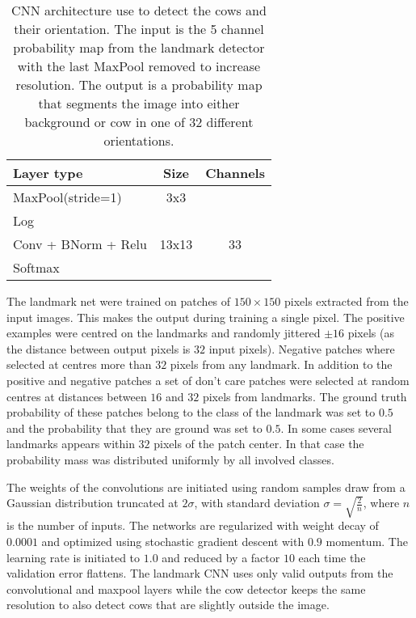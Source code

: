 \documentclass[10pt,a4paper,twocolumn]{article}
\begin{document}
\begin{table}
\begin{center}
\begin{tabular}{|l|c|c|}
\hline 
\textbf{Layer type} & \textbf{Size} & \textbf{Channels} \\ 
\hline 

MaxPool(stride=1) & 3x3 &  \\ 
Log & & \\
Conv + BNorm + Relu & 13x13 & 33 \\ 
Softmax & & \\
\hline 
\end{tabular}
\end{center}
\caption{CNN architecture use to detect the cows and their orientation. The input is the 5 channel probability map from the landmark detector with the last MaxPool removed to increase resolution. The output is a probability map that segments the image into either background or cow in one of 32 different orientations.}
\label{tab:cowdirnet}
\end{table}

The landmark net were trained on patches of $150\times 150$ pixels extracted from the input images. This makes the output during training a single pixel. The positive examples were centred on the landmarks and randomly jittered $\pm 16$ pixels (as the distance between output pixels is $32$ input pixels). Negative patches where selected at centres more than $32$ pixels from any landmark. In addition to the positive and negative patches a set of don't care patches were selected at random centres at distances between $16$ and $32$ pixels from landmarks. The ground truth probability of these patches belong to the class of the landmark was set to $0.5$ and the probability that they are ground was set to $0.5$. In some cases several landmarks appears within $32$ pixels of the patch center. In that case the probability mass was distributed uniformly by all involved classes.

The weights of the convolutions are initiated using random samples draw from a Gaussian 
distribution truncated at $2\sigma$, with standard deviation $\sigma=\sqrt{\frac{2}{n}}$, 
where $n$ is the number of inputs\cite{DBLP:journals/corr/HeZR015}. The networks are regularized with weight decay of 
$0.0001$ and optimized using stochastic gradient descent with $0.9$ momentum. The 
learning rate is initiated to $1.0$ and reduced by a factor $10$ each time the validation 
error flattens. The landmark CNN uses only valid outputs from the convolutional and maxpool 
layers while the cow detector keeps the same resolution to also detect cows that are 
slightly outside the image.
\end{document}
